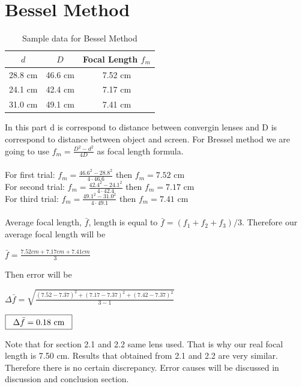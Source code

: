 \documentclass[a4paper,12pt]{report}
\begin{document}
\section{Bessel Method}
\begin{table}[h]
\begin{center}
	\begin{tabular}{|c|c|c|}
	\hline  $d$ &  $D$ & Focal Length $f_{m}$ \\ 
	\hline 28.8 cm & 46.6 cm & 7.52 cm \\ 
	\hline 24.1 cm & 42.4 cm & 7.17 cm \\ 
	\hline 31.0 cm & 49.1 cm & 7.41 cm \\ 
	\hline 
	\end{tabular} 
\end{center}
\caption{Sample data for Bessel Method}
\end{table}
In this part d is correspond to distance between convergin lenses and D is correspond to distance between object and screen. For Bressel method we are going to use $f_{m}=\frac{D^{2}-d^{2}}{4D}$ as focal length formula.\\\\
For first trial: $f_{m}=\frac{46.6^{2}-28.8^{2}}{4\cdot46.6}$ then $f_{m}=7.52$ cm\\
For second trial: $f_{m}=\frac{42.4^{2}-24.1^{2}}{4\cdot42.4}$ then $f_{m}=7.17$ cm\\
For third trial: $f_{m}=\frac{49.1^{2}-31.0^{2}}{4\cdot49.1}$ then $f_{m}=7.41$ cm\\\\ 
Average focal length, $\bar{f}$, length is equal to $\bar{f}=(f_{1}+f_{2}+f_{3})/3$. Therefore our average focal length will be
\begin{center}
	$\bar{f}=\frac{7.52 cm+7.17cm+7.41cm}{3}$\\
\end{center}
\begin{center}
\end{center}
Then error will be
\begin{center}
	$\Delta\bar{f}=\sqrt{\frac{(7.52-7.37)^{2}+(7.17-7.37)^{2}+(7.42-7.37)^{2}}{3-1}}$
\end{center}
\begin{center}
	$\framebox[80pt]{$\Delta\bar{f}=0.18$ cm}$
\end{center}
Note that for section 2.1 and 2.2 same lens used. That is why our real focal length is 7.50 cm. Results that obtained from 2.1 and 2.2 are very similar. Therefore there is no certain discrepancy. Error causes will be discussed in discussion and conclusion section.
\newpage
\end{document}
